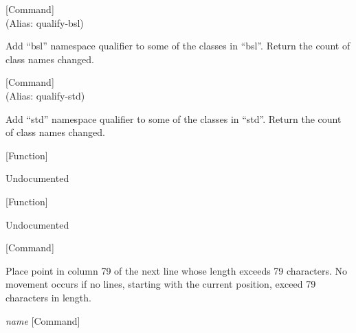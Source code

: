 \vspace{1em}
\noindent
{}
\usebox{\funcname}
 \hfill [Command]\\%
 (Alias: qualify-bsl)

\begin{doc-string}
Add ``bsl'' namespace qualifier to some of the classes in ``bsl''.  Return the
count of class names changed.
\end{doc-string}

\vspace{1em}
\noindent
{}
\usebox{\funcname}
 \hfill [Command]\\%
 (Alias: qualify-std)

\begin{doc-string}
Add ``std'' namespace qualifier to some of the classes in ``std''.  Return the
count of class names changed.
\end{doc-string}

\vspace{1em}
\noindent
{}
\usebox{\funcname}
 \hfill [Function]

\begin{doc-string}
Undocumented
\end{doc-string}

\vspace{1em}
\noindent
{}
\usebox{\funcname}
 \hfill [Function]

\begin{doc-string}
Undocumented
\end{doc-string}

\vspace{1em}
\noindent
{}
\usebox{\funcname}
 \hfill [Command]

\begin{doc-string}
Place point in column 79 of the next line whose length exceeds 79 characters.
No movement occurs if no lines, starting with the current position, exceed 79
characters in length.
\end{doc-string}

\vspace{1em}
\noindent
{}
\usebox{\funcname}\emph{name}
 \hfill [Command]

